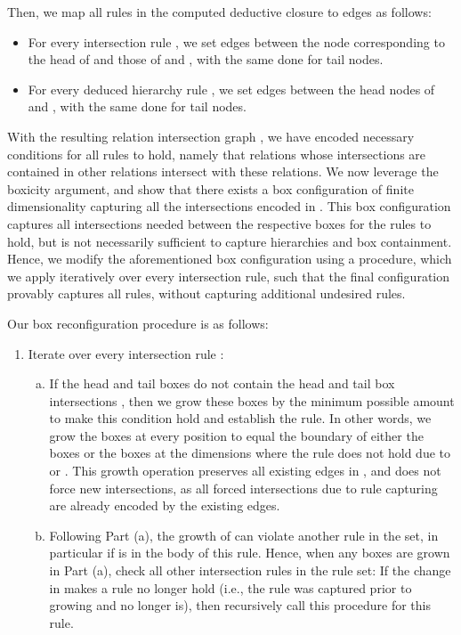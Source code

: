 \documentclass{article}
\begin{document}
Then, we map all rules in the computed deductive closure to edges as follows: 
\begin{itemize}
\item For every intersection rule , we set edges between the node corresponding to the head of  and those of  and , with the same done for tail nodes. 
\item For every deduced hierarchy rule , we set edges between the head nodes of  and , with the same done for tail nodes.
\end{itemize}

With the resulting relation intersection graph , we have encoded necessary conditions for all rules to hold, namely that relations whose intersections are contained in other relations intersect with these relations. We now leverage the boxicity argument, and show that there exists a box configuration of finite dimensionality capturing all the intersections encoded in . This box configuration captures all intersections needed between the respective boxes for the rules to hold, but is not necessarily sufficient to capture hierarchies and box containment. Hence, we modify the aforementioned box configuration using a procedure, which we apply iteratively over every intersection rule, such that the final configuration provably captures all rules, without capturing additional undesired rules. 

Our box reconfiguration procedure is as follows:
\begin{enumerate}
    \item Iterate over every intersection rule :
    \begin{enumerate}[(a)]
    \item If the  head and tail boxes do not contain the head and tail box intersections , then we grow these  boxes by the minimum possible amount to make this condition hold and establish the rule. In other words, we grow the  boxes at every position to equal the boundary of either the  boxes or the  boxes at the dimensions where the rule does not hold due to  or . This growth operation preserves all existing edges in , and does not force new intersections, as all forced intersections due to rule capturing are already encoded by the existing edges.
    
    \item Following Part (a), the growth of  can violate another rule in the set, in particular if  is in the body of this rule. Hence, when any  boxes are grown in Part (a), check all other intersection rules in the rule set: If the change in  makes a rule no longer hold (i.e., the rule was captured prior to growing  and no longer is), then recursively call this procedure for this rule.
    \end{enumerate}

\end{enumerate}
\end{document}
